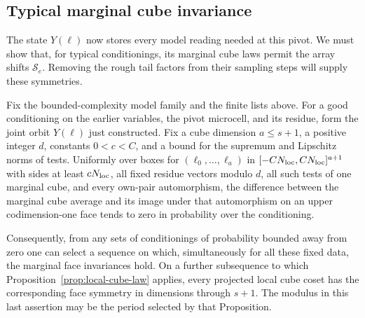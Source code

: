 \subsection{Typical marginal cube invariance}

The state $Y(\ell)$ now stores every model reading needed at this pivot.
We must show that, for typical conditionings, its marginal cube laws
permit the array shifts $\mathcal S_e$.  Removing the rough tail factors
from their sampling steps will supply these symmetries.

\begin{lemma}\label{lem:conditional-face-invariance}
Fix the bounded-complexity model family and the finite lists above.
For a good conditioning on the earlier variables, the pivot microcell,
and its residue, form the joint orbit $Y(\ell)$ just constructed.
Fix a cube dimension $a\le s+1$, a positive integer $d$, constants
$0<c<C$, and a bound for the supremum and Lipschitz norms of tests.
Uniformly over boxes for $(\ell_0,\ldots,\ell_a)$ in
$[-CN_{\rm loc},CN_{\rm loc}]^{a+1}$ with sides at least
$cN_{\rm loc}$, all fixed residue vectors modulo $d$, all such tests
of one marginal cube, and every own-pair automorphism, the difference
between the marginal cube average and its image under that
automorphism on an upper codimension-one face tends to zero in
probability over the conditioning.

Consequently, from any sets of conditionings of probability bounded
away from zero one can select a sequence on which, simultaneously
for all these fixed data, the marginal face invariances hold.  On
a further subsequence to which Proposition~\ref{prop:local-cube-law}
applies, every projected local cube coset has the corresponding face
symmetry in dimensions through $s+1$.  The modulus in this last
assertion may be the period selected by that Proposition.
\end{lemma}

